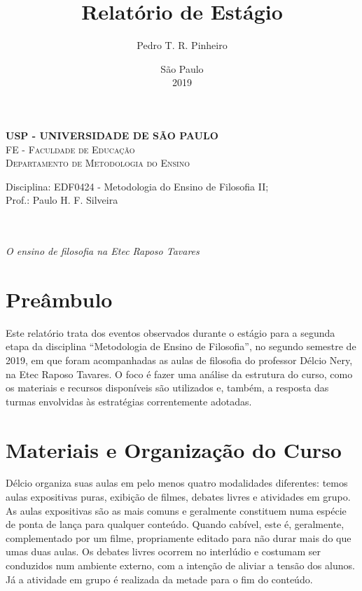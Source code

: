 \documentclass[12pt,a4paper]{article}
\author{Pedro T. R. Pinheiro}
\date{São Paulo\\2019}
\title{Relatório de Estágio}
\newcommand{\subtitulo}{O ensino de filosofia na Etec Raposo Tavares}
\newcommand{\disciplina}{EDF0424 - Metodologia do Ensino de Filosofia II}
\newcommand{\departamento}{Departamento de Metodologia do Ensino}
\newcommand{\unidade}{FE - Faculdade de Educação}
\newcommand{\prof}{Paulo H. F. Silveira}
\begin{document}
	\begin{center}
				\textbf{
				\LARGE USP - UNIVERSIDADE DE SÃO PAULO \\
			}
			\Large \textsc{\unidade} \\
			\large \textsc{\departamento}\\
			\vspace*{1cm}
				
			Disciplina: \disciplina; \\Prof.: \prof
			\vfill
			\begin{center}
				{\Large \textsc{\theauthor}} \\ 
				\vspace{1cm}
				\LARGE\textbf{\thetitle} \\
				\Large\emph{\subtitulo}
			\end{center}
			\vfill
			\large\thedate
			\vspace*{1cm}
			\thispagestyle{empty}			
	\end{center}

	\newpage

	\setlength{\parskip}{0.5cm}
	\setlength{\parindent}{1.1cm}
	\onehalfspacing
	
	\section{Preâmbulo}
	
	Este relatório trata dos eventos observados durante o estágio para a segunda 
	etapa da disciplina ``Metodologia de Ensino de Filosofia'', no segundo 
	semestre de 2019, em que foram acompanhadas as aulas de filosofia do 
	professor Délcio Nery, na Etec Raposo Tavares. O foco é fazer uma análise 
	da estrutura do curso, como os materiais e recursos disponíveis são 
	utilizados e, também, a resposta das turmas envolvidas às estratégias 
	correntemente adotadas. 
	
	
	
	
	\newpage
	
	\section{Materiais e Organização do Curso}
	
    Délcio organiza suas aulas em pelo menos quatro modalidades diferentes: 
    temos aulas expositivas puras, exibição de filmes, debates livres e 
    atividades em grupo. As aulas expositivas são as mais comuns e geralmente 
    constituem numa espécie de ponta de lança para qualquer conteúdo. Quando 
    cabível, este é, geralmente, complementado por um filme, propriamente 
    editado para não durar mais do que umas duas aulas. Os debates livres 
    ocorrem no interlúdio e costumam ser conduzidos num ambiente externo, com 
    a intenção de aliviar a tensão dos alunos. Já a atividade em grupo é 
    realizada da metade para o fim do conteúdo. 
    
\end{document}
